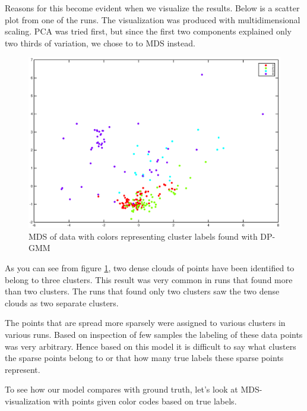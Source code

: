 \documentclass[a4paper]{article}
\begin{document}
Reasons for this become evident when we visualize the results. Below is a scatter plot from one of the runs. The visualization was produced with multidimensional scaling. PCA was tried first, but since the first two components explained only two thirds of variation, we chose to to MDS instead. 

\begin{figure}[H]
	\includegraphics[trim={3.5cm 1.5cm 3cm 1.3cm},clip,scale=0.45]{5000_normalized_data_1.eps}
	\caption{MDS of data with colors representing cluster labels found with DP-GMM}
	\label{mds_unsupervised}
\end{figure}

As you can see from figure \ref{mds_unsupervised}, two dense clouds of points have been identified to belong to three clusters. This result was very common in runs that found more than two clusters. The runs that found only two clusters saw the two dense clouds as two separate clusters.

 The points that are spread more sparsely were assigned to various clusters in various runs. Based on inspection of few samples the labeling of these data points was very arbitrary. Hence based on this model it is difficult to say what clusters the sparse points belong to or that how many true labels these sparse points represent.

To see how our model compares with ground truth, let's look at MDS-visualization with points given color codes based on true labels.
\end{document}
